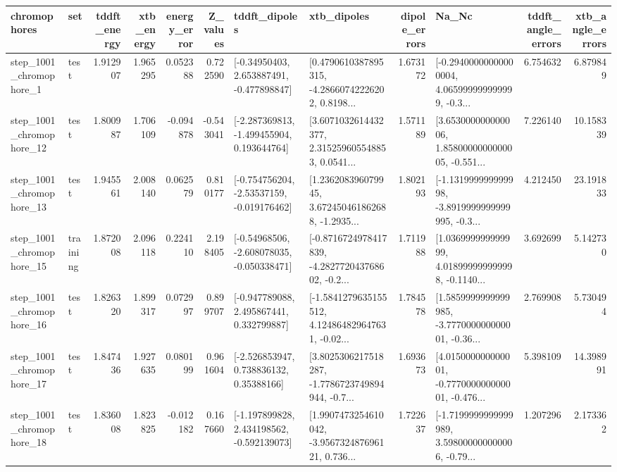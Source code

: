 \begin{tabular}{llrrrrllrlrr}
\toprule
             chromophores &       set &  tddft\_energy &  xtb\_energy &  energy\_error &  Z\_values &                               tddft\_dipoles &                                        xtb\_dipoles &  dipole\_errors &                                              Na\_Nc &  tddft\_angle\_errors &  xtb\_angle\_errors \\
\midrule
  step\_1001\_chromophore\_1 &      test &      1.912907 &    1.965295 &      0.052388 &  0.722590 &    [-0.34950403, 2.653887491, -0.477898847] &  [0.4790610387895315, -4.28660742226202, 0.8198... &       1.673172 &  [-0.29400000000000004, 4.065999999999999, -0.3... &            6.754632 &          6.879849 \\
 step\_1001\_chromophore\_12 &      test &      1.800987 &    1.706109 &     -0.094878 & -0.543041 &   [-2.287369813, -1.499455904, 0.193644764] &  [3.6071032614432377, 2.315259605548853, 0.0541... &       1.571189 &  [3.653000000000006, 1.8580000000000005, -0.551... &            7.226140 &         10.158339 \\
 step\_1001\_chromophore\_13 &      test &      1.945561 &    2.008140 &      0.062579 &  0.810177 &   [-0.754756204, -2.53537159, -0.019176462] &  [1.236208396079945, 3.672450461862688, -1.2935... &       1.802193 &  [-1.131999999999998, -3.8919999999999995, -0.3... &            4.212450 &         23.191833 \\
 step\_1001\_chromophore\_15 &  training &      1.872008 &    2.096118 &      0.224110 &  2.198405 &   [-0.54968506, -2.608078035, -0.050338471] &  [-0.8716724978417839, -4.282772043768602, -0.2... &       1.711988 &  [1.036999999999999, 4.018999999999998, -0.1140... &            3.692699 &          5.142730 \\
 step\_1001\_chromophore\_16 &      test &      1.826320 &    1.899317 &      0.072997 &  0.899707 &    [-0.947789088, 2.495867441, 0.332799887] &  [-1.5841279635155512, 4.124864829647631, -0.02... &       1.784578 &  [1.5859999999999985, -3.777000000000001, -0.36... &            2.769908 &          5.730494 \\
 step\_1001\_chromophore\_17 &      test &      1.847436 &    1.927635 &      0.080199 &  0.961604 &     [-2.526853947, 0.738836132, 0.35388166] &  [3.8025306217518287, -1.7786723749894944, -0.7... &       1.693673 &  [4.015000000000001, -0.777000000000001, -0.476... &            5.398109 &         14.398991 \\
 step\_1001\_chromophore\_18 &      test &      1.836008 &    1.823825 &     -0.012182 &  0.167660 &   [-1.197899828, 2.434198562, -0.592139073] &  [1.9907473254610042, -3.956732487696121, 0.736... &       1.722637 &  [-1.7199999999999989, 3.598000000000006, -0.79... &            1.207296 &          2.173362 \\

\end{tabular}
